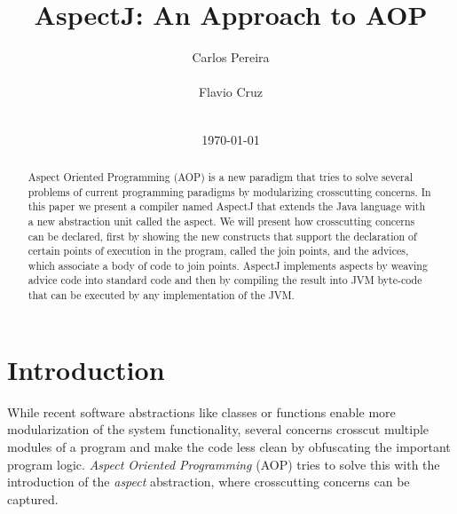 \documentclass{template}
\begin{document}
\title{AspectJ: An Approach to AOP}


\author{
\alignauthor
Carlos Pereira\\
       \\
\alignauthor
Flavio Cruz\\
       \\
}
\date{\today}

\maketitle
\begin{abstract}
Aspect Oriented Programming (AOP) is a new paradigm that tries to solve several problems of
current programming paradigms by modularizing crosscutting concerns.
In this paper we present a compiler named AspectJ that extends
the Java language with a new abstraction unit called the aspect. We will present
how crosscutting concerns can be declared, first by showing the new constructs that support
the declaration of certain points of execution in the program, called the join points, and the
advices, which associate a body of code to join points. AspectJ implements aspects by weaving advice
code into standard code and then by compiling the result into JVM byte-code that can be
executed by any implementation of the JVM.
 
\end{abstract}


\section{Introduction}

While recent software abstractions like classes or functions enable
more modularization of the system functionality, several concerns crosscut multiple modules of a program and make
the code less clean by obfuscating the important program logic. \emph{Aspect Oriented Programming} (AOP) tries to solve this
with the introduction of the \emph{aspect} abstraction, where crosscutting concerns can be captured.
\end{document}

